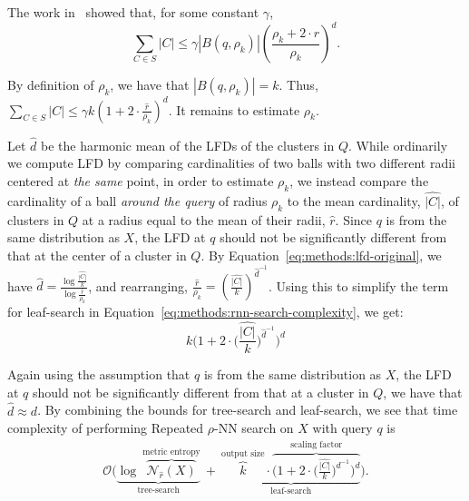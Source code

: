The work in~\cite{yu2015entropy} showed that, for some constant $\gamma$,
\begin{equation*}
    \sum_{C \in S} |C| \leq \gamma \left| B(q, \rho_k) \right| \left(\frac{\rho_k + 2 \cdot \hat{r}}{\rho_k} \right)^d.
\end{equation*}

By definition of $\rho_k$, we have that $|B(q, \rho_k)| = k$.
Thus, $\sum_{C \in S} |C| \leq \gamma k \left( 1 + 2 \cdot \frac{\hat{r}}{\rho_k} \right)^d$.
It remains to estimate $\rho_k$.

Let $\hat{d}$ be the harmonic mean of the LFDs of the clusters in $Q$.
While ordinarily we compute LFD by comparing cardinalities of two balls with two different radii centered at \textit{the same} point, in order to estimate $\rho_k$, we instead compare the cardinality of a ball \textit{around the query} of radius $\rho_k$ to the mean cardinality, $\hat{|C|}$, of clusters in $Q$ at a radius equal to the mean of their radii, $\hat{r}$.
Since $q$ is from the same distribution as $X$, the LFD at $q$ should not be significantly different from that at the center of a cluster in $Q$.
By Equation~\ref{eq:methods:lfd-original}, we have $\hat{d} = \frac{\log{}\frac{\hat{|C|}}{k}}{\log{}\frac{\hat{r}}{\rho_k}}$, and rearranging, $\frac{\hat{r}}{\rho_k} = \left( \frac{\hat{|C|}}{k} \right)^{\hat{d}^{-1}}$.
Using this to simplify the term for leaf-search in Equation~\ref{eq:methods:rnn-search-complexity}, we get:
\begin{equation*}
    k \Bigg( 1 + 2 \cdot \bigg( \frac{\hat{|C|}}{k} \bigg) ^ {\hat{d}^{-1}} \Bigg)^d
\end{equation*}

Again using the assumption that $q$ is from the same distribution as $X$, the LFD at $q$ should not be significantly different from that at a cluster in $Q$, we have that $\hat{d} \approx d$.
By combining the bounds for tree-search and leaf-search, we see that time complexity of performing Repeated $\rho$-NN search on $X$ with query $q$ is
\begin{gather}
    \mathcal{O}
    \Bigg(
        \underbrace{
            \log~\overbrace{\mathcal{N}_{\hat{r}}(X)}^{\textrm{metric entropy}}
        }_{\textrm{tree-search}}
        \ + \
        \underbrace{
            \overbrace{k}^{\textrm{output size}} \cdot
            \overbrace{\bigg( 1 + 2 \cdot \Big( \frac{\hat{|C|}}{k} \Big) ^ {d^{-1}} \bigg)^d}^{\textrm{scaling factor}}
        }_{\textrm{leaf-search}}
    \Bigg).
    \label{eq:methods:repeated-rnn-complexity}
\end{gather}

